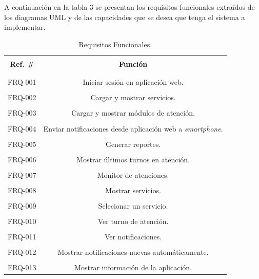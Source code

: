 A continuación en la tabla 3 se presentan los requisitos funcionales extraídos de los diagramas UML y de las capacidades que se desea que tenga el sistema a implementar.

\begin{spacing}{1.0}
\begin{table}[H]
\centering
\caption{Requisitos Funcionales.} 
\begin{tabular}{|c|c|}
\hline 
\rowcolor{gray!30} &\\
\rowcolor{gray!30} \textbf{Ref. \#} & \textbf{Función} \\ 
\rowcolor{gray!30} &\\
\hline 
&\\[-0.2cm]
FRQ-001 & Iniciar sesión en aplicación web.\\
\hline
&\\[-0.2cm]
FRQ-002 & Cargar y mostrar servicios.\\
\hline
&\\[-0.2cm]
FRQ-003 & Cargar y mostrar módulos de atención.\\
\hline
&\\[-0.2cm]
FRQ-004 & Enviar notificaciones desde aplicación web a \textit{smartphone}.\\ 
\hline
&\\[-0.2cm]
FRQ-005 & Generar reportes.\\
\hline
&\\[-0.2cm]
FRQ-006 & Mostrar últimos turnos en atención.\\
\hline
&\\[-0.2cm]
FRQ-007 & Monitor de atenciones.\\
\hline
&\\[-0.2cm]
FRQ-008 & Mostrar servicios.\\
\hline
&\\[-0.2cm]
FRQ-009 & Selecionar un servicio.\\ 
\hline
&\\[-0.2cm]
FRQ-010 & Ver turno de atención.\\
\hline
&\\[-0.2cm]
FRQ-011 & Ver notificaciones.\\
\hline
&\\[-0.2cm]
FRQ-012 & Mostrar notificaciones nuevas automáticamente.\\
\hline
&\\[-0.2cm]
FRQ-013 & Mostrar información de la aplicación.\\
\hline
\end{tabular}
\label{tabla_pila}
\end{table}
\end{spacing}

